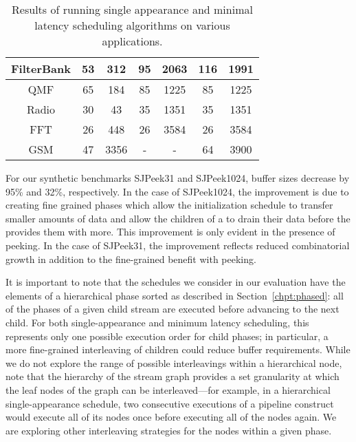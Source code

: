 \begin{table*}
\begin{tabular}{|c|c|c|c|c|c|c|}
\hline FilterBank & 53 & 312 & 95 & 2063 & 116 & 1991 \\
\hline QMF & 65 & 184 & 85 & 1225 & 85 & 1225 \\
\hline Radio & 30 & 43 & 35 & 1351 & 35 & 1351 \\
\hline FFT & 26 & 448 & 26 & 3584 & 26 & 3584 \\
\hline GSM & 47 & 3356 & - & - & 64 & 3900 \\
\hline
\end{tabular}
\caption{\small Results of running single appearance and minimal
latency scheduling algorithms on various applications.}
\label{tbl:results}
\vspace{-4pt}
\end{table*}

For our synthetic benchmarks SJPeek31 and SJPeek1024, buffer sizes
decrease by 95\% and 32\%, respectively. In the case of SJPeek1024,
the improvement is due to creating fine grained phases which allow the
initialization schedule to transfer smaller amounts of data and allow
the children of a {\splitjoin} to drain their data before the
{\splitter} provides them with more. This improvement is only evident
in the presence of peeking. In the case of SJPeek31, the improvement
reflects reduced combinatorial growth in addition to the fine-grained
benefit with peeking.

It is important to note that the schedules we consider in our
evaluation have the elements of a hierarchical phase sorted as
described in Section~\ref{chpt:phased}: all of the phases of a given
child stream are executed before advancing to the next child.  For
both single-appearance and minimum latency scheduling, this represents
only one possible execution order for child phases; in particular, a
more fine-grained interleaving of children could reduce buffer
requirements.  While we do not explore the range of possible
interleavings within a hierarchical node, note that the hierarchy of
the stream graph provides a set granularity at which the leaf nodes of
the graph can be interleaved---for example, in a hierarchical
single-appearance schedule, two consecutive executions of a pipeline
construct would execute all of its nodes once before executing all of
the nodes again.  We are exploring other interleaving strategies for
the nodes within a given phase.
